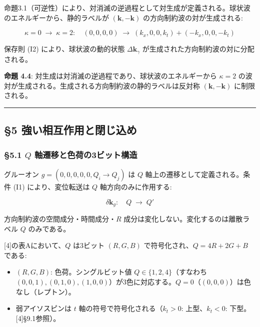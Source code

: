 \documentclass[
  a4paper,11pt]{ltjsarticle}
\providecommand{\tightlist}{%
  \setlength{\itemsep}{0pt}\setlength{\parskip}{0pt}}
\theoremstyle{definition}
\theoremstyle{remark}
\begin{document}
命題3.1（可逆性）により、対消滅の逆過程として対生成が定義される。球状波のエネルギーから、静的ラベルが
\((\mathbf{k}, -\mathbf{k})\) の方向制約波の対が生成される:

\[\kappa = 0 \;\longrightarrow\; \kappa = 2:\quad (0, 0, 0, 0) \;\longrightarrow\; (k_x, 0, 0, k_t) + (-k_x, 0, 0, -k_t)\]

保存則 (I2) により、球状波の動的状態 \(\Delta\mathbf{k}_\gamma\)
が生成された方向制約波の対に分配される。

\textbf{命題 4.4}: 対生成は対消滅の逆過程であり、球状波のエネルギーから
\(\kappa = 2\)
の波対が生成される。生成される方向制約波の静的ラベルは反対称
\((\mathbf{k}, -\mathbf{k})\) に制限される。

\begin{center}\rule{0.5\linewidth}{0.5pt}\end{center}

\subsection{§5
強い相互作用と閉じ込め}\label{ux5f37ux3044ux76f8ux4e92ux4f5cux7528ux3068ux9589ux3058ux8fbcux3081}

\subsubsection{\texorpdfstring{§5.1 \(Q\)
軸遷移と色荷の3ビット構造}{§5.1 Q 軸遷移と色荷の3ビット構造}}\label{q-ux8ef8ux9077ux79fbux3068ux8272ux8377ux306e3ux30d3ux30c3ux30c8ux69cbux9020}

グルーオン \(g = (0, 0, 0, 0, 0, Q_i \to Q_j)\) は \(Q\)
軸上の遷移として定義される。条件 (I1) により、変位転送は \(Q\)
軸方向のみに作用する:

\[\delta\mathbf{k}_g: \quad Q \;\longrightarrow\; Q'\]

方向制約波の空間成分・時間成分・\(R\)
成分は変化しない。変化するのは離散ラベル \(Q\) のみである。

{[}4{]}の表Aにおいて、\(Q\) は3ビット \((R, G, B)\)
で符号化され、\(Q = 4R + 2G + B\) である:

\begin{itemize}
\tightlist
\item
  \((R, G, B)\): 色荷。シングルビット値 \(Q \in \{1, 2, 4\}\)（すなわち
  \((0,0,1), (0,1,0), (1,0,0)\)）が3色に対応する。\(Q = 0\)（\((0,0,0)\)）は色なし（レプトン）。
\item
  弱アイソスピンは \(t\) 軸の符号で符号化される（\(k_t > 0\):
  上型、\(k_t < 0\): 下型。{[}4{]}§9.1参照）。
\end{itemize}
\end{document}
